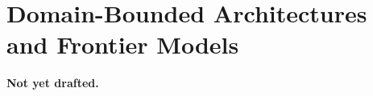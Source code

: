 \section{Domain-Bounded Architectures and Frontier Models}
\label{sec:architecture}


\textbf{Not yet drafted.}
